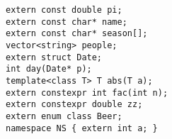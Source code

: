 \documentclass{article}
\begin{document}
 \texttt{extern const double pi;}
 \\
 \texttt{extern const char* name;}
 \\
 \texttt{extern const char* season[];}
 \\
 \texttt{vector<string> people;}
 \\
 \texttt{extern struct Date;}
 \\
 \texttt{int day(Date* p);}
 \\
 \texttt{template<class T> T abs(T a);}
 \\
 \texttt{extern constexpr int fac(int n);}
 \\
 \texttt{extern constexpr double zz;}
 \\
 \texttt{extern enum class Beer;}
 \\
 \texttt{namespace NS \{ extern int a; \}}
 
\end{document}
